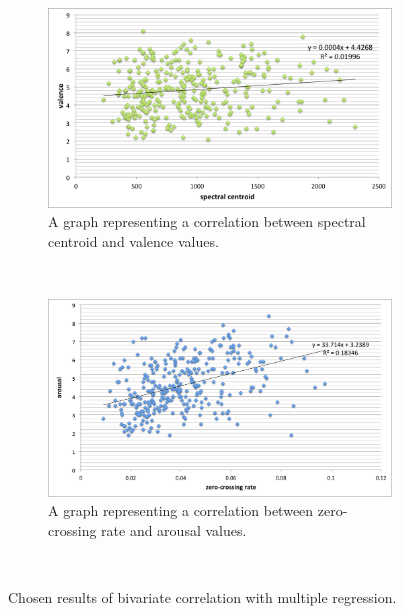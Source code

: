 \begin{figure}
        \centering
        \begin{subfigure}[b]{0.48\textwidth}
                \includegraphics[width=\textwidth]{Figures/spectralcentroid-valence}
                \caption{A graph representing a correlation between spectral centroid and valence values.}
                \label{fig:is }
        \end{subfigure}%
        ~ %
        \begin{subfigure}[b]{0.48\textwidth}
                \includegraphics[width=\textwidth]{Figures/zerocrossing-arousal}
                \caption{A graph representing a correlation between zero-crossing rate and arousal values.}
        \end{subfigure}
          \caption{Chosen results of bivariate correlation with multiple regression.}
        ~ %
                        \label{fig:bivariateNN}

\end{figure}


